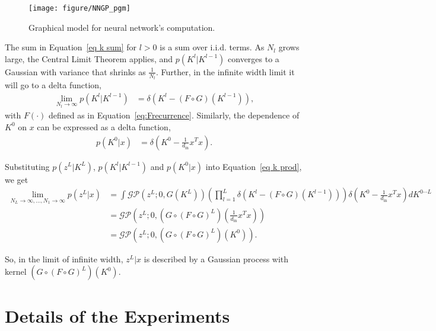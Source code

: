\documentclass{article} %
\newcommand{\mc}{\mathcal}
\begin{document}
\begin{appendix}
\begin{figure}[ht]
  \centering
  \texttt{[image: figure/NNGP\_pgm]}
  \caption{Graphical model for neural network's computation.
  }
  \label{fig:pgm}
\end{figure}

The sum in Equation~\ref{eq k sum} for $l>0$ is a sum over i.i.d. terms. As $N_l$ grows large, the Central Limit Theorem applies, and $p\left( K^l | K^{l-1} \right)$ converges to a Gaussian with variance that shrinks as $\frac{1}{N_l}$. Further, in the infinite width limit it will go to a delta function,
\begin{align}
\lim_{N_l \rightarrow \infty } p\left( K^l | K^{l-1} \right) &= \delta\left( K^l - \left( F \circ  G\right)\left( K^{l-1} \right) \right)
,
\end{align}
with $F\left( \cdot \right)$ defined as in Equation~\ref{eq:Frecurrence}.
Similarly, the dependence of $K^0$ on $x$ can be expressed as a delta function,
\begin{align}
p\left( K^0 | x \right) &= \delta\left( K^0 - \frac{1}{d_{\text{in}}} x^T x \right).
\end{align}

Substituting $p( z^L | K^L )$, $p\left( K^l | K^{l-1} \right)$ and $p\left( K^0 | x \right)$ into Equation~\ref{eq k prod}, we get
\begin{align}
\lim_{N_L \rightarrow \infty, ..., N_1\rightarrow \infty }
p( z^L | x ) 
 &=  \int 
 	\mc {GP} \left( z^L; 0, G\left( K^L \right) \right) 
 	 \left( \prod_{l=1}^L 
	 \delta\left( K^l - \left(F \circ G\right)\left( K^{l-1} \right) \right)
 	\right) \delta\left( K^0 - \frac{1}{d_{\text{in}}} x^T x \right) dK^{0\cdots L}
 \nonumber \\
 &= \mc {GP} \left( z^L; 0, \left( G \circ \left( F \circ G \right)^L \right)\left(    \frac{1}{d_{\text{in}}} x^T x  \right)
 \right) \nonumber \\
 &= \mc {GP} \left( z^L; 0, \left( G \circ \left( F \circ G \right)^L \right)\left( K^0 \right)
 \right)
.
\end{align}

So, in the limit of infinite width, $z^L | x$ is described by a Gaussian process with kernel $\left( G \circ \left( F \circ G \right)^L \right)\left( K^0  \right)$.


\section{Details of the Experiments}


\end{appendix}
\end{document}

